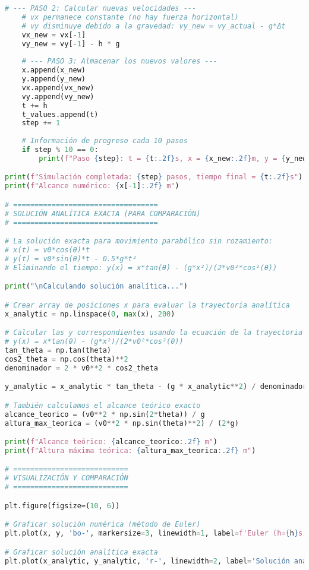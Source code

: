 \documentclass[12pt,a4paper]{article}
\begin{document}
\begin{lstlisting}[language=Python, basicstyle=\small\ttfamily]
    # --- PASO 2: Calcular nuevas velocidades ---
    # vx permanece constante (no hay fuerza horizontal)
    # vy disminuye debido a la gravedad: vy_new = vy_actual - g*Δt
    vx_new = vx[-1]  
    vy_new = vy[-1] - h * g
    
    # --- PASO 3: Almacenar los nuevos valores ---
    x.append(x_new)
    y.append(y_new)
    vx.append(vx_new)
    vy.append(vy_new)
    t += h
    t_values.append(t)
    step += 1
    
    # Información de progreso cada 10 pasos
    if step % 10 == 0:
        print(f"Paso {step}: t = {t:.2f}s, x = {x_new:.2f}m, y = {y_new:.2f}m")

print(f"Simulación completada: {step} pasos, tiempo final = {t:.2f}s")
print(f"Alcance numérico: {x[-1]:.2f} m")

# ==================================
# SOLUCIÓN ANALÍTICA EXACTA (PARA COMPARACIÓN)
# ==================================

# La solución exacta para movimiento parabólico sin rozamiento:
# x(t) = v0*cos(θ)*t
# y(t) = v0*sin(θ)*t - 0.5*g*t²
# Eliminando el tiempo: y(x) = x*tan(θ) - (g*x²)/(2*v0²*cos²(θ))

print("\nCalculando solución analítica...")

# Crear array de posiciones x para evaluar la trayectoria analítica
x_analytic = np.linspace(0, max(x), 200)

# Calcular las y correspondientes usando la ecuación de la trayectoria
# y(x) = x*tan(θ) - (g*x²)/(2*v0²*cos²(θ))
tan_theta = np.tan(theta)
cos2_theta = np.cos(theta)**2
denominador = 2 * v0**2 * cos2_theta

y_analytic = x_analytic * tan_theta - (g * x_analytic**2) / denominador

# También calculamos el alcance teórico exacto
alcance_teorico = (v0**2 * np.sin(2*theta)) / g
altura_max_teorica = (v0**2 * np.sin(theta)**2) / (2*g)

print(f"Alcance teórico: {alcance_teorico:.2f} m")
print(f"Altura máxima teórica: {altura_max_teorica:.2f} m")

# ===========================
# VISUALIZACIÓN Y COMPARACIÓN
# ===========================

plt.figure(figsize=(10, 6))

# Graficar solución numérica (método de Euler)
plt.plot(x, y, 'bo-', markersize=3, linewidth=1, label=f'Euler (h={h}s)')

# Graficar solución analítica exacta
plt.plot(x_analytic, y_analytic, 'r-', linewidth=2, label='Solución analítica')


\end{lstlisting}
\end{document}
